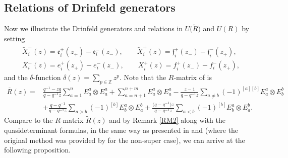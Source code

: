 \documentclass[pdftex]{sigma}
\numberwithin{equation}{section}
\begin{document}
\subsection{Relations of Drinfeld generators}\label{sec5.2}

Now we illustrate the Drinfeld generators and relations in $U\bigl(\widetilde{R}\bigr)$ and $U(R)$ by setting
\begin{gather*}
 \widetilde{X}^{-}_i(z)=\mathfrak{e}^+_{i}(z_+)-\mathfrak{e}^-_{i}(z_-),\qquad
 \widetilde{X}^{+}_i(z)=\mathfrak{f}^+_{i}(z_-)-\mathfrak{f}^-_{i}(z_+),\\
 X^{-}_i(z)=e^+_{i}(z_+)-e^-_{i}(z_-),\qquad
 X^{+}_i(z)=f^+_{i}(z_-)-f^-_{i}(z_+),
\end{gather*}
and the $\delta$-function
$ \delta(z)=\sum_{p\in\mathbb{Z}}z^p$.
Note that the $R$-matrix of  is
\begin{align*}
 \overline{R}(z)={}&\frac{q^{-1}-zq}{q-q^{-1}z}\sum\limits_{a=1 }^{n}E^a_a\otimes E^a_a+\sum\limits_{a=n+1 }^{n+m}E^a_a\otimes E^a_a-\frac{z-1}{q-q^{-1}z}\sum\limits_{a\neq b}(-1)^{[a][b]}E^a_a\otimes E^b_b\nonumber\\
 &+\frac{q-q^{-1}}{q-q^{-1}z}\sum\limits_{a>b}(-1)^{[b]}E^a_b\otimes E^b_a+\frac{\bigl(q-q^{-1}\bigr)z}{q-q^{-1}z}\sum\limits_{a<b }(-1)^{[b]}E^a_b\otimes E^b_a.
\end{align*}
Compare to the $R$-matrix $\widetilde{R}(z)$ and by Remark \ref{RM2} along with the quasideterminant formulas, in the same way as presented in \cite{JSKW,HBKD} and \cite{YZC} (where the original method was provided by \cite{JDIB} for the non-super case), we can arrive at the following proposition.
\end{document}
